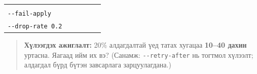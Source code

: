 \begin{longtable}[]{@{}llllll@{}}
\begin{minipage}[t]{0.14\columnwidth}
\strut
\end{minipage} & \begin{minipage}[t]{0.14\columnwidth}\raggedright
\strut
\end{minipage} & \begin{minipage}[t]{0.14\columnwidth}\raggedright
\strut
\end{minipage}\tabularnewline
\begin{minipage}[t]{0.14\columnwidth}\raggedright
\texttt{-\/-fail-apply}\strut
\end{minipage} & \begin{minipage}[t]{0.14\columnwidth}\raggedright
\strut
\end{minipage} & \begin{minipage}[t]{0.14\columnwidth}\raggedright
\strut
\end{minipage} & \begin{minipage}[t]{0.14\columnwidth}\raggedright
\strut
\end{minipage} & \begin{minipage}[t]{0.14\columnwidth}\raggedright
\strut
\end{minipage} & \begin{minipage}[t]{0.14\columnwidth}\raggedright
\strut
\end{minipage}\tabularnewline
\begin{minipage}[t]{0.14\columnwidth}\raggedright
\texttt{-\/\allowbreak{}-drop-rate\ 0.\allowbreak{}2}\strut
\end{minipage} & \begin{minipage}[t]{0.14\columnwidth}\raggedright
\strut
\end{minipage} & \begin{minipage}[t]{0.14\columnwidth}\raggedright
\strut
\end{minipage} & \begin{minipage}[t]{0.14\columnwidth}\raggedright
\strut
\end{minipage} & \begin{minipage}[t]{0.14\columnwidth}\raggedright
\strut
\end{minipage} & \begin{minipage}[t]{0.14\columnwidth}\raggedright
\strut
\end{minipage}\tabularnewline
\bottomrule
\end{longtable}\endgroup

\begin{quote}
\textbf{Хүлээгдэх ажиглалт:} 20\% алдагдалтай үед татах хугацаа \textbf{10--40 дахин} уртасна. Яагаад ийм их вэ? (Санамж: \texttt{-\/-retry-after} нь тогтмол хүлээлт; алдагдал бүрд бүтэн завсарлага зарцуулагдана.)
\end{quote}

